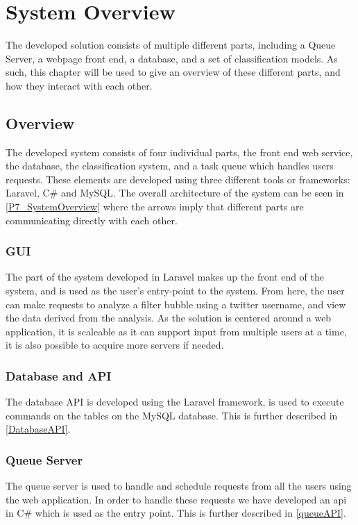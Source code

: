 \chapter{System Overview}\label{ch:sysview}  The developed solution
consists of multiple different parts, including a Queue Server, a webpage front
end, a database, and a set of classification models. As such, this chapter
will be used to give an overview of these different parts, and how they
interact with each other.

\section{Overview}
The developed system consists of four individual parts, the front end web
service, the database, the classification system, and a task queue which handles
users requests. These elements are developed using three different tools or
frameworks: Laravel, C\# and MySQL. The overall architecture of the
system can be seen in \autoref{P7_SystemOverview} where the arrows imply that
different parts are communicating directly with each other.
 




\subsection{GUI} %
The part of the system developed in Laravel makes up the front end of the
system, and is used as the user's entry-point to the system. From here, the
user can make requests to analyze a filter bubble using a twitter username, and
view the data derived from the analysis. As the solution is centered around a web
application, it is scaleable as it can support input from multiple users
at a time, it is also possible to acquire more servers if needed. 

\subsection{Database and API}
The database API is developed using the Laravel framework, is used to execute
commands on the tables on the MySQL database. This is further described in
\autoref{DatabaseAPI}.

\subsection{Queue Server}
The queue server is used to handle and schedule requests from all the users
using the web application. In order to handle these requests we have developed
an api in C\# which is used as the entry point. This is further described in
\autoref{queueAPI}. 

